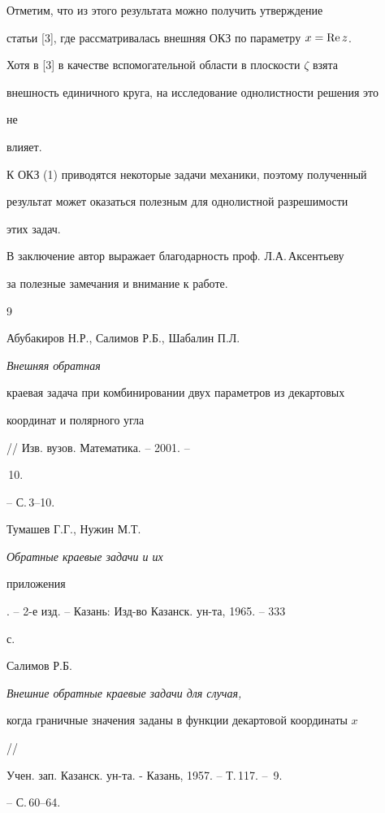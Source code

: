  


Отметим, что из этого результата можно получить утверждение  


статьи [3], где рассматривалась внешняя ОКЗ по параметру $x=\operatorname{Re} z$. 


Хотя в [3] в качестве вспомогательной области в плоскости $\zeta$ взята  


внешность единичного круга, на исследование однолистности решения это 


не  


влияет. 


 


К ОКЗ (1) приводятся некоторые задачи механики, поэтому полученный  


результат может оказаться полезным для однолистной разрешимости  


этих задач. 


 


В заключение автор выражает благодарность проф. Л.А.\,Аксентьеву  


за полезные замечания и внимание к работе. 


 


 


\begin{thebibliography}{9} 


 




Абубакиров Н.Р., Салимов Р.Б., Шабалин П.Л. {\em Внешняя обратная  


краевая задача при комбинировании двух параметров из декартовых  


координат и полярного угла} // Изв. вузов. Математика. -- 2001. -- 


\No\,10.  


-- С.\,3--10. 




Тумашев Г.Г., Нужин М.Т. {\em Обратные краевые задачи и их  


приложения}. -- 2-е изд. -- Казань: Изд-во Казанск. ун-та, 1965. -- 333 


с. 




Салимов Р.Б. {\em Внешние обратные краевые задачи для случая,  


когда граничные значения заданы в функции декартовой координаты $x$} //  


Учен. зап. Казанск. ун-та. - Казань, 1957. -- Т.\,117. -- \No\,9. 


-- С.\,60--64. 


 


\end{thebibliography} 


 


\vskip 2cm 


 






 


\label{end} 


 





